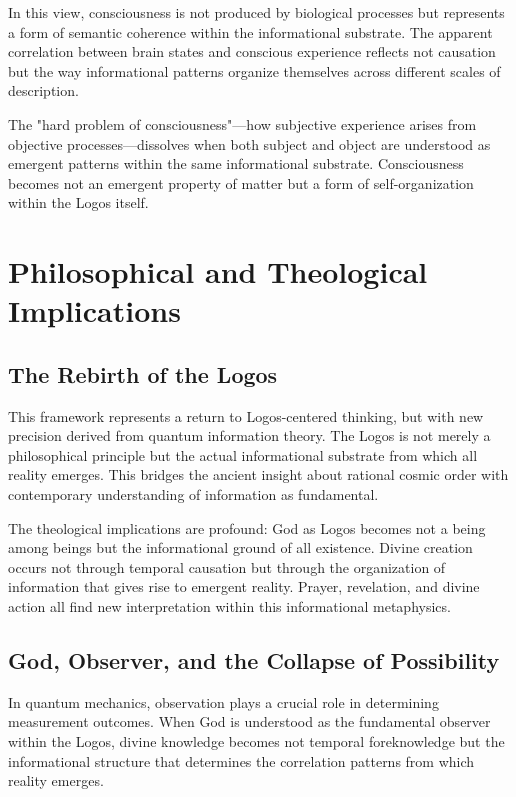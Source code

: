 \documentclass[12pt]{article}
\begin{document}
In this view, consciousness is not produced by biological processes but represents a form of semantic coherence within the informational substrate. The apparent correlation between brain states and conscious experience reflects not causation but the way informational patterns organize themselves across different scales of description.

The "hard problem of consciousness"—how subjective experience arises from objective processes—dissolves when both subject and object are understood as emergent patterns within the same informational substrate. Consciousness becomes not an emergent property of matter but a form of self-organization within the Logos itself.

\section{Philosophical and Theological Implications}

\subsection{The Rebirth of the Logos}

This framework represents a return to Logos-centered thinking, but with new precision derived from quantum information theory. The Logos is not merely a philosophical principle but the actual informational substrate from which all reality emerges. This bridges the ancient insight about rational cosmic order with contemporary understanding of information as fundamental.

The theological implications are profound: God as Logos becomes not a being among beings but the informational ground of all existence. Divine creation occurs not through temporal causation but through the organization of information that gives rise to emergent reality. Prayer, revelation, and divine action all find new interpretation within this informational metaphysics.

\subsection{God, Observer, and the Collapse of Possibility}

In quantum mechanics, observation plays a crucial role in determining measurement outcomes. When God is understood as the fundamental observer within the Logos, divine knowledge becomes not temporal foreknowledge but the informational structure that determines the correlation patterns from which reality emerges.
\end{document}
